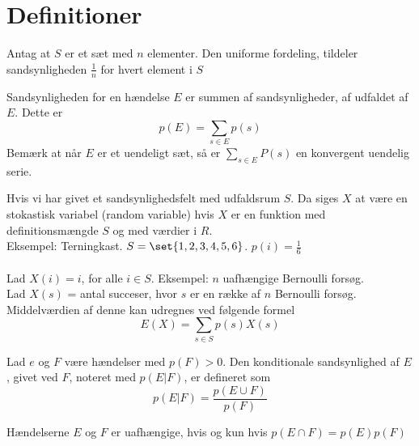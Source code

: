\section{Definitioner}

\begin{frdef}[S. 440, 1]
Antag at $S$ er et sæt med $n$ elementer. Den uniforme fordeling, tildeler sandsynligheden $\frac{1}{n}$ for hvert element i $S$
\end{frdef}

\begin{frdef}[S. 440, 2]
Sandsynligheden for en hændelse $E$ er summen af sandsynligheder, af udfaldet af $E$. Dette er 
\begin{equation}
p(E)=\sum_{s\in E} p(s)
\end{equation}
Bemærk at når $E$ er et uendeligt sæt, så er $\sum_{s\in E} P(s)$ en konvergent uendelig serie.
\end{frdef}

\begin{frdef}[SLIAL02, S. 9]
Hvis vi har givet et sandsynlighedsfelt med udfaldsrum $S$. 
Da siges $X$ at være en stokastisk variabel (random variable) hvis $X$ er en funktion med definitionsmængde $S$ og med værdier i $R$.\\
Eksempel: Terningkast. $S = \set{1, 2, 3, 4, 5, 6}$.
$p(i) = \frac{1}{6}$
\\\\
Lad $X(i) = i$, for alle $i \in S$. Eksempel: $n$ uafhængige Bernoulli forsøg.\\
Lad $X(s)$ = antal succeser, hvor $s$ er en række af $n$ Bernoulli
forsøg.
\\Middelværdien af denne kan udregnes ved følgende formel
\begin{equation}
E(X)=\sum_{s\in S} p(s)X(s)
\end{equation}
\end{frdef}

\begin{frdef}[S. 442, 3]
Lad $e$ og $F$ være hændelser med $p(F)>0$. Den konditionale sandsynlighed af $E$, givet ved $F$, noteret med $p(E|F)$, er defineret som
\begin{equation}
p(E|F)=\frac{p(E\cup F)}{p(F)}
\end{equation}
\end{frdef}

\begin{frdef}[S. 443, 4]
Hændelserne $E$ og $F$ er uafhængige, hvis og kun hvis $p(E\cap F)=p(E)p(F)$
\end{frdef}

